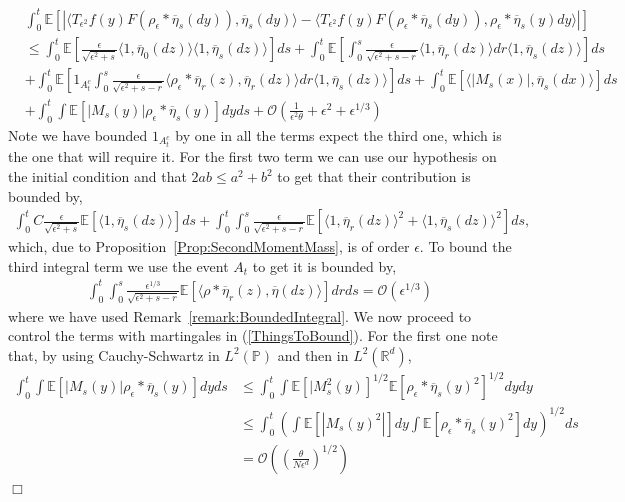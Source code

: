 \documentclass[12pt]{article}
\newenvironment {proof}{{\noindent\bf Proof }}{\hfill $\Box$ \medskip}
\newcommand{\IE}{\mathbb E}
\begin{document}
\begin{proof}
\begin{align}
&\int_0^t \IE[|\langle T_{\epsilon^2} f(y) F(\rho_\epsilon *\overline{\eta}_s(dy)), \overline{\eta}_s(dy) \rangle - \langle T_{\epsilon^2} f(y) F(\rho_\epsilon * \overline{\eta}_s(dy)), \rho_\epsilon * \overline{\eta}_s(y) dy \rangle|] \nonumber \\ &\leq   \int_0^t \IE[ \frac{\epsilon}{\sqrt{\epsilon^2 + s}} \langle 1,\overline{\eta}_0(dz) \rangle \langle 1, \overline{\eta}_s(dz)\rangle ] ds +  \int_0^t \IE[  \int_0^s \frac{\epsilon}{\sqrt{\epsilon^2 + s - r}} \langle 1, \overline{\eta}_r (dz) \rangle dr \langle 1, \overline{\eta}_s(dz) \rangle  ] ds \nonumber\\ & + \int_0^t \IE[   1_{A^c_{t}} \int_0^s \frac{\epsilon}{\sqrt{\epsilon^2 + s - r}} \langle \rho_\epsilon*\overline{\eta}_r(z), \overline{\eta}_r(dz) \rangle dr \langle 1, \overline{\eta}_s(dz) \rangle  ] ds + \int_0^t \IE[\langle |M_s(x)|,\overline{\eta}_s(dx) \rangle] ds \nonumber \\ &+ \int_0^t \int \IE[|M_s(y)|\rho_\epsilon*\overline{\eta}_s(y)] dy ds  +\mathcal{O}\left( \frac{1}{\epsilon^2 \theta} + \epsilon^2 + \epsilon^{1/3} \right)  \label{ThingsToBound}
\end{align}
Note we have bounded $1_{A^c_{t}}$ by one in all the terms expect the third one, which is the one that will require it. For the first two term we can use our hypothesis on the initial condition and that $2 ab \leq a^2+b^2$ to get that their contribution is bounded by,
\begin{align*}
\int_0^t C \frac{\epsilon}{\sqrt{\epsilon^2+s}}\IE[\langle 1, \overline{\eta}_s(dz) \rangle] ds + \int_0^t \int_0^s \frac{\epsilon}{\sqrt{\epsilon^2+s-r}}\IE[\langle 1, \overline{\eta}_r(dz)\rangle^2 + \langle 1, \overline{\eta}_s(dz)\rangle^2] ds,
\end{align*}
which, due to Proposition~\ref{Prop:SecondMomentMass}, is of order $\epsilon$. To bound the third integral term we use the event $A_{t}$ to get it is bounded by,
\begin{align*}
\int_0^t \int_0^s \frac{\epsilon^{1/3}}{\sqrt{\epsilon^2+s-r}} \IE[ \langle \rho*\overline{\eta}_r(z), \overline{\eta}(dz) \rangle] dr ds = \mathcal{O}(\epsilon^{1/3})
\end{align*}
where we have used Remark~\ref{remark:BoundedIntegral}. 
We now proceed to control the terms with martingales in (\ref{ThingsToBound}). For the first one note that, by using Cauchy-Schwartz in $L^2(\mathbb{P})$ and then in $L^2(\mathbb{R}^d)$,
\begin{align}
\int_0^t \int \IE[|M_s(y)|\rho_\epsilon*\overline{\eta}_s(y)] dy ds & \leq \int_0^t \int \IE[|M^2_s(y)]^{1/2} \IE[\rho_\epsilon * \overline{\eta}_s(y)^2]^{1/2} dy dy \nonumber \\ & \leq \int_0^t \left( \int \IE[|M_s(y)^2|] dy \int \IE[\rho_\epsilon * \overline{\eta}_s(y)^2] dy \right)^{1/2} ds  \nonumber \\ &= \mathcal{O}\left( \left( \frac{\theta}{N \epsilon^d} \right)^{1/2} \right)

\end{align}
\end{proof}
\end{document}
